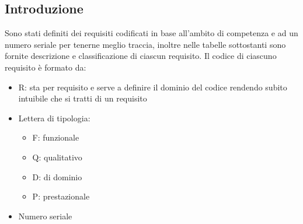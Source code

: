 \subsection{Introduzione}
Sono stati definiti dei requisiti codificati in base all'ambito di competenza e ad un numero seriale per tenerne meglio traccia, inoltre nelle tabelle sottostanti sono fornite descrizione e classificazione di ciascun requisito.
\tabularnewline
Il codice di ciascuno requisito è formato da:
\begin{itemize}
	\item R: sta per requisito e serve a definire il dominio del codice rendendo subito intuibile che si tratti di un requisito
	\item Lettera di tipologia:
	\begin{itemize}
		\item F: funzionale
		\item Q: qualitativo
		\item D: di dominio
		\item P: prestazionale
	\end{itemize}
	\item Numero seriale
\end{itemize}

